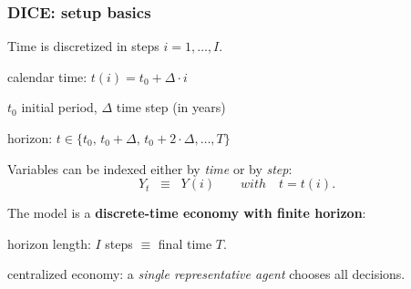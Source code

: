 \documentclass[xcolor=x11names,compress,aspectratio=169]{beamer}%
\makeatletter
\renewenvironment{itemize}{\begin{compactitemize}[<+-| alert@+>]}{\end{compactitemize}}
\makeatother
\begin{document}
\begin{frame}%
%

\frametitle{DICE: setup basics}%


\begin{itemize}
\item Time is discretized in steps $i=1,\ldots,I$.

\begin{itemize}
\item calendar time: $t(i)=t_{0}+\Delta\cdot i$

\item $t_{0}$ initial period, $\Delta$ time step (in years)

\item horizon: $t\in\{t_{0},\,t_{0}+\Delta,\,t_{0}+2\cdot\Delta,\ldots,T\}$
\end{itemize}

\vspace{1.5ex}

\item Variables can be indexed either by \emph{time} or by \emph{step}:
\[
Y_{t}\;\;\equiv\;\;Y(i)\qquad with\quad t=t(i).
\]
\vspace{0.5ex}

\item The model is a \textbf{discrete-time economy with finite horizon}:%
\vspace{1ex}%


\begin{itemize}
\item horizon length: $I$ steps $\equiv$ final time $T$.%
\vspace{0.5ex}%


\item centralized economy: a \emph{single representative agent} chooses all decisions.
\end{itemize}
\end{itemize}

%

\transboxout
\end{frame}%
%
\end{document}
